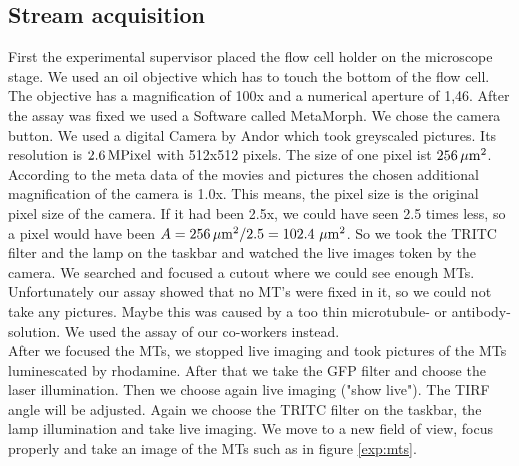 	\subsection{Stream acquisition}
        First the experimental supervisor placed the flow cell holder on the microscope stage. We used an oil objective which has to touch the bottom of the flow cell. The objective has a magnification of 100x and a numerical aperture of 1,46.  
        After the assay was fixed we used a Software called MetaMorph. We chose the camera button. We used a digital Camera by Andor which took greyscaled pictures. Its resolution is $\unit[2.6]{MPixel}$ with 512x512 pixels. The size of one pixel ist $\unit[256]{\mu m^2}$.
        According to the meta data of the movies and pictures the chosen additional magnification of the camera is 1.0x. This means, the pixel size is the original pixel size of the camera. If it had been 2.5x, we could have seen 2.5 times less, so a pixel would have been $A = \unit[256]{\mu m^2} / 2.5 = 102.4\ \unit{\mu m^2}$. 
        So we took the TRITC filter and the lamp on the taskbar and watched the live images token by the camera. We searched and focused a cutout where we could see enough MTs. 
        Unfortunately our assay showed that no MT's were fixed in it, so we could not take any pictures. Maybe this was caused by a too thin microtubule- or antibody-solution. We used the assay of our co-workers instead.\\ 
        After we focused the MTs, we stopped live imaging and took pictures of the MTs luminescated by rhodamine. After that we take the GFP filter and choose the laser illumination. Then we choose again live imaging ("show live"). The TIRF angle will be adjusted.  %
        Again we choose the TRITC filter on the taskbar, the lamp illumination and take live imaging. We move to a new field of view, focus properly and take an image of the MTs such as in figure \ref{exp:mts}.\\
